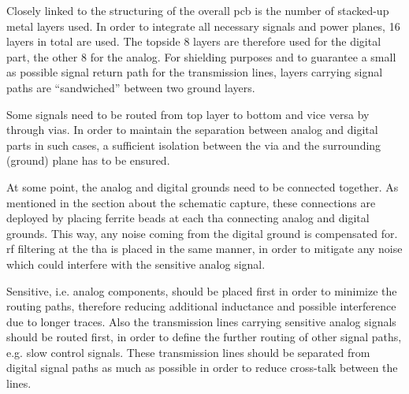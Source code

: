 Closely linked to the structuring of the overall \gls{pcb} is the number of stacked-up metal layers used.
In order to integrate all necessary signals and power planes, 16 layers in total are used.
The topside 8 layers are therefore used for the digital part, the other 8 for the analog.
For shielding purposes and to guarantee a small as possible signal return path for the transmission lines, layers carrying signal paths are ``sandwiched'' between two ground layers.

Some signals need to be routed from top layer to bottom and vice versa by through vias. 
In order to maintain the separation between analog and digital parts in such cases, a sufficient isolation between the via and the surrounding (ground) plane has to be ensured.

At some point, the analog and digital grounds need to be connected together. 
As mentioned in the section about the schematic capture, these connections are deployed by placing ferrite beads at each \gls{tha} connecting analog and digital grounds.
This way, any noise coming from the digital ground is compensated for. 
\gls{rf} filtering at the \gls{tha} is placed in the same manner, in order to mitigate any noise which could interfere with the sensitive analog signal.

Sensitive, i.e. analog components, should be placed first in order to minimize the routing paths, therefore reducing additional inductance and possible interference due to longer traces.
Also the transmission lines carrying sensitive analog signals should be routed first, in order to define the further routing of other signal paths, e.g. slow control signals. 
These transmission lines should be separated from digital signal paths as much as possible in order to reduce cross-talk between the lines. 

